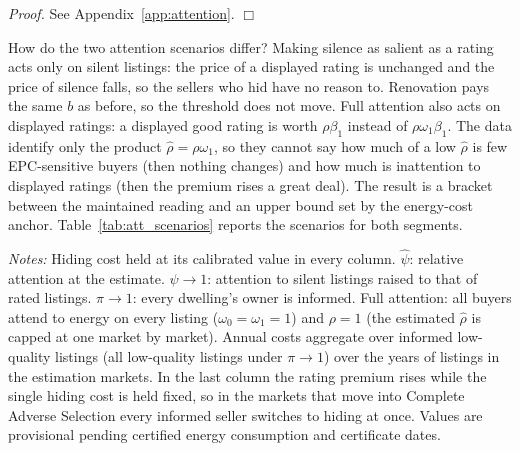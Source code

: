 \documentclass[10pt,letterpaper]{bp-template-concise}
\begin{document}
\noindent\textit{Proof.} See Appendix~\ref{app:attention}. $\Box$

\medskip

How do the two attention scenarios differ? Making silence as salient as a rating acts only on silent listings: the price of a displayed rating is unchanged and the price of silence falls, so the sellers who hid have no reason to. Renovation pays the same $b$ as before, so the threshold does not move. Full attention also acts on displayed ratings: a displayed good rating is worth $\rho\beta_1$ instead of $\rho\omega_1\beta_1$. The data identify only the product $\hat\rho=\rho\omega_1$, so they cannot say how much of a low $\hat\rho$ is few EPC-sensitive buyers (then nothing changes) and how much is inattention to displayed ratings (then the premium rises a great deal). The result is a bracket between the maintained reading and an upper bound set by the energy-cost anchor. Table~\ref{tab:att_scenarios} reports the scenarios for both segments.

\begin{table}[htbp]
\centering
\caption{Policy Scenarios}
\label{tab:att_scenarios}
\small\renewcommand{\arraystretch}{1.3}


\vspace{0.5em}
\raggedright
\footnotesize
\textit{Notes:} Hiding cost held at its calibrated value in every column. $\hat\psi$: relative attention at the estimate. $\psi\to1$: attention to silent listings raised to that of rated listings. $\pi\to1$: every dwelling's owner is informed. Full attention: all buyers attend to energy on every listing ($\omega_0=\omega_1=1$) and $\rho=1$ (the estimated $\hat\rho$ is capped at one market by market). Annual costs aggregate over informed low-quality listings (all low-quality listings under $\pi\to1$) over the \attSampleYears{} years of listings in the estimation markets. In the last column the rating premium rises while the single hiding cost is held fixed, so in the markets that move into Complete Adverse Selection every informed seller switches to hiding at once. Values are provisional pending certified energy consumption and certificate dates.
\end{table}
\end{document}
